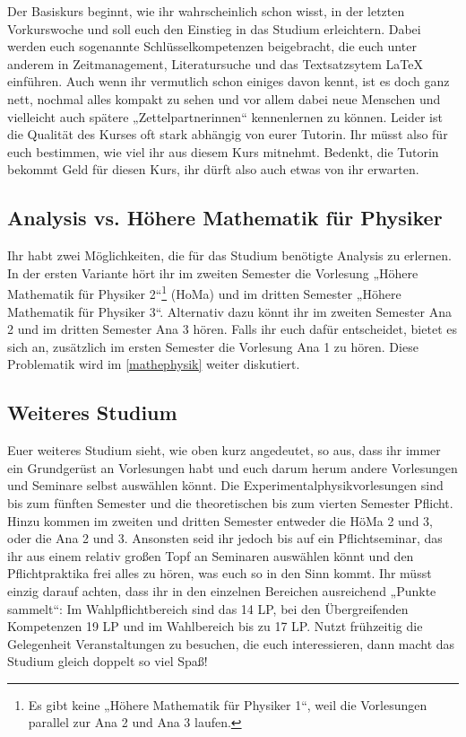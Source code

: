 Der Basiskurs beginnt, wie ihr wahrscheinlich schon wisst, in der letzten Vorkurswoche und soll euch den Einstieg in das Studium erleichtern. Dabei werden euch sogenannte Schlüsselkompetenzen beigebracht, die euch unter anderem in Zeitmanagement, Literatursuche und das Textsatzsytem \LaTeX{} einführen. Auch wenn ihr vermutlich schon einiges davon kennt, ist es doch ganz nett, nochmal alles kompakt zu sehen und vor allem dabei neue Menschen und vielleicht auch spätere „Zettelpartnerinnen“ kennenlernen zu können. Leider ist die Qualität des Kurses oft stark abhängig von eurer Tutorin. Ihr müsst also für euch bestimmen, wie viel ihr aus diesem Kurs mitnehmt. Bedenkt, die Tutorin bekommt Geld für diesen Kurs, ihr dürft also auch etwas von ihr erwarten. 

\subsection{Analysis vs. Höhere Mathematik für Physiker}
Ihr habt zwei Möglichkeiten, die für das Studium benötigte Analysis zu erlernen.
In der ersten Variante hört ihr im zweiten Semester die Vorlesung „Höhere Mathematik für Physiker 2“\footnote{Es gibt keine „Höhere Mathematik für Physiker 1“, weil die Vorlesungen parallel zur Ana 2 und Ana 3 laufen.} (\gls{HoMa}) und im dritten Semester „Höhere Mathematik für Physiker 3“. Alternativ dazu könnt ihr im zweiten Semester Ana 2 und im dritten Semester Ana 3 hören. Falls ihr euch dafür entscheidet, bietet es sich an, zusätzlich im ersten Semester die Vorlesung Ana 1 zu hören. Diese Problematik wird im \autoref{mathephysik} weiter diskutiert.

\subsection{Weiteres Studium}

Euer weiteres Studium sieht, wie oben kurz angedeutet, so aus, dass ihr immer ein Grundgerüst an Vorlesungen habt und euch darum herum andere Vorlesungen und Seminare selbst auswählen könnt. Die Experimentalphysikvorlesungen sind bis zum fünften Semester und die theoretischen bis zum vierten Semester Pflicht. Hinzu kommen im zweiten und dritten Semester entweder die HöMa 2 und 3, oder die Ana 2 und 3. Ansonsten seid ihr jedoch bis auf ein Pflichtseminar, das ihr aus einem relativ großen Topf an Seminaren auswählen könnt und den Pflichtpraktika frei alles zu hören, was euch so in den Sinn kommt. Ihr müsst einzig darauf achten, dass ihr in den einzelnen Bereichen ausreichend „Punkte sammelt“: Im Wahlpflichtbereich sind das 14 \gls{LP}, bei den Übergreifenden Kompetenzen 19 \gls{LP} und im Wahlbereich bis zu 17 \gls{LP}. Nutzt frühzeitig die Gelegenheit Veranstaltungen zu besuchen, die euch interessieren, dann macht das Studium gleich doppelt so viel Spaß!

